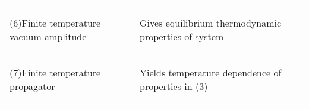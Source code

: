 \begin{table}[H]
\begin{tabular}{p{}p{}}
\begin{center}
(6)Finite temperature vacuum amplitude
\end{center}
 & \begin{center}
Gives equilibrium thermodynamic properties of system
\end{center}
 \\
\begin{center}
(7)Finite temperature propagator
\end{center}
 & \begin{center}
Yields temperature dependence of properties in (3)
\end{center}
 \\
\hline
\end{tabular}
        
\end{table}